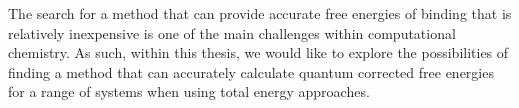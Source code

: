 The search for a method that can provide accurate free energies of binding that is relatively inexpensive is one of the main challenges within computational chemistry.  As such, within this thesis, we would like to explore the possibilities of finding a method that can accurately calculate quantum corrected free energies for a range of systems when using total energy approaches.



